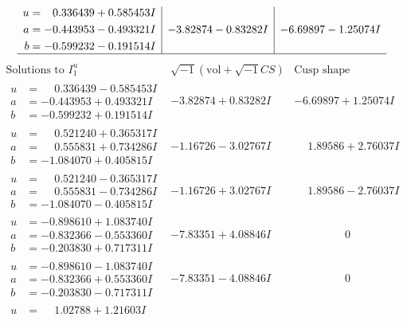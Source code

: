 \documentclass[1p]{elsarticle_modified}
\theoremstyle{definition}
\newcommand{\I}{\sqrt{-1}}
\begin{document}
$$\begin{array}{c|c|c}
\begin{aligned}
u &= \phantom{-}0.336439 + 0.585453 I \\
a &= -0.443953 - 0.493321 I \\
b &= -0.599232 - 0.191514 I\end{aligned}
 & -3.82874 - 0.83282 I & -6.69897 - 1.25074 I\\
 \hline 
 \end{array}$$\newpage$$\begin{array}{c|c|c}  
\text{Solutions to }I^u_{1}& \I (\text{vol} + \sqrt{-1}CS) & \text{Cusp shape}\\
 \hline 
\begin{aligned}
u &= \phantom{-}0.336439 - 0.585453 I \\
a &= -0.443953 + 0.493321 I \\
b &= -0.599232 + 0.191514 I\end{aligned}
 & -3.82874 + 0.83282 I & -6.69897 + 1.25074 I \\ \hline\begin{aligned}
u &= \phantom{-}0.521240 + 0.365317 I \\
a &= \phantom{-}0.555831 + 0.734286 I \\
b &= -1.084070 + 0.405815 I\end{aligned}
 & -1.16726 - 3.02767 I & \phantom{-}1.89586 + 2.76037 I \\ \hline\begin{aligned}
u &= \phantom{-}0.521240 - 0.365317 I \\
a &= \phantom{-}0.555831 - 0.734286 I \\
b &= -1.084070 - 0.405815 I\end{aligned}
 & -1.16726 + 3.02767 I & \phantom{-}1.89586 - 2.76037 I \\ \hline\begin{aligned}
u &= -0.898610 + 1.083740 I \\
a &= -0.832366 - 0.553360 I \\
b &= -0.203830 + 0.717311 I\end{aligned}
 & -7.83351 + 4.08846 I & \phantom{-0.000000 } 0 \\ \hline\begin{aligned}
u &= -0.898610 - 1.083740 I \\
a &= -0.832366 + 0.553360 I \\
b &= -0.203830 - 0.717311 I\end{aligned}
 & -7.83351 - 4.08846 I & \phantom{-0.000000 } 0 \\ \hline\begin{aligned}
u &= \phantom{-}1.02788 + 1.21603 I \\

\end{aligned}
\end{array}$$
\end{document}
